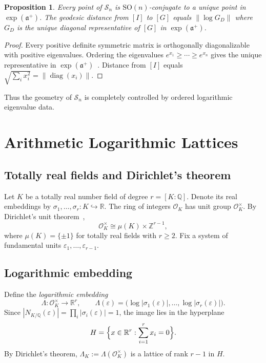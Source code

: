 \documentclass[12pt]{article}
\newtheorem{proposition}[theorem]{Proposition}
\theoremstyle{definition}
\theoremstyle{remark}
\newcommand{\R}{\mathbb{R}}
\newcommand{\Z}{\mathbb{Z}}
\newcommand{\Q}{\mathbb{Q}}
\newcommand{\SO}{\mathrm{SO}}
\newcommand{\calM}{\mathcal{S}}
\newcommand{\diag}{\operatorname{diag}}
\begin{document}
\begin{proposition}
Every point of $\calM_n$ is $\SO(n)$-conjugate to a unique point
in $\exp(\mathfrak{a}^+)$.
The geodesic distance from $[I]$ to $[G]$ equals
$\|\log G_D\|$ where $G_D$ is the unique diagonal representative of
$[G]$ in $\exp(\mathfrak{a}^+)$.
\end{proposition}

\begin{proof}
Every positive definite symmetric matrix is orthogonally diagonalizable
with positive eigenvalues.
Ordering the eigenvalues $e^{x_1} \geq \cdots \geq e^{x_n}$ gives the
unique representative in $\exp(\mathfrak{a}^+)$~\cite[Ch.~V]{Helgason}.
Distance from $[I]$ equals $\sqrt{\sum_i x_i^2} = \|\diag(x_i)\|$.
\end{proof}

Thus the geometry of $\calM_n$ is completely controlled by ordered
logarithmic eigenvalue data.

\section{Arithmetic Logarithmic Lattices}
\label{sec:lattice}

\subsection{Totally real fields and Dirichlet's theorem}

Let $K$ be a totally real number field of degree $r = [K:\Q]$.
Denote its real embeddings by $\sigma_1,\ldots,\sigma_r : K \hookrightarrow \R$.
The ring of integers $\mathcal{O}_K$ has unit group $\mathcal{O}_K^\times$.
By Dirichlet's unit theorem~\cite{Neukirch},
\[
  \mathcal{O}_K^\times \cong \mu(K) \times \Z^{r-1},
\]
where $\mu(K) = \{\pm 1\}$ for totally real fields with $r \geq 2$.
Fix a system of fundamental units $\varepsilon_1,\ldots,\varepsilon_{r-1}$.

\subsection{Logarithmic embedding}

Define the \emph{logarithmic embedding}
\[
  \Lambda : \mathcal{O}_K^\times \to \R^r, \qquad
  \Lambda(\varepsilon) =
  \bigl(\log|\sigma_1(\varepsilon)|,\ldots,\log|\sigma_r(\varepsilon)|\bigr).
\]
Since $|N_{K/\Q}(\varepsilon)| = \prod_i |\sigma_i(\varepsilon)| = 1$,
the image lies in the hyperplane
\[
  H = \Bigl\{x \in \R^r : \sum_{i=1}^r x_i = 0\Bigr\}.
\]
By Dirichlet's theorem, $\Lambda_K := \Lambda(\mathcal{O}_K^\times)$ is
a lattice of rank $r-1$ in $H$.
\end{document}

